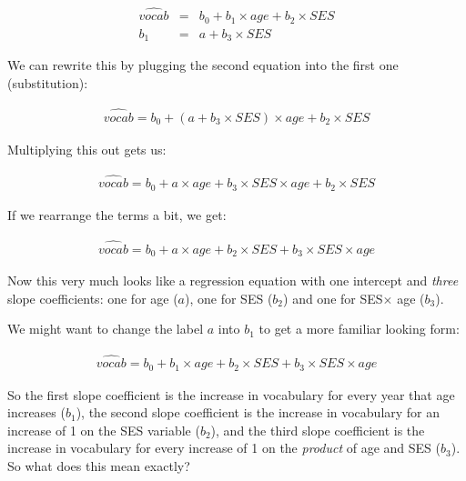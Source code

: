 \documentclass[]{book}\usepackage[]{graphicx}\usepackage[]{color}
\begin{document}
\begin{eqnarray}
\widehat{vocab} &=& b_0 + b_1 \times age + b_2 \times SES  \\
b_1 &=& a + b_3 \times SES
\end{eqnarray}

We can rewrite this by plugging the second equation into the first one (substitution):

\begin{eqnarray}
\widehat{vocab} = b_0 + (a + b_3 \times SES)  \times age + b_2 \times SES 
\end{eqnarray}


Multiplying this out gets us:

\begin{eqnarray}
\widehat{vocab} = b_0 + a \times age + b_3 \times SES  \times age + b_2 \times SES
\end{eqnarray}

If we rearrange the terms a bit, we get:

\begin{eqnarray}
\widehat{vocab} = b_0 + a \times age + b_2 \times SES + b_3 \times SES  \times age
\end{eqnarray}

Now this very much looks like a regression equation with one intercept and \textit{three} slope coefficients: one for age ($a$), one for SES ($b_2$) and one for SES$\times$ age ($b_3$).


We might want to change the label $a$ into $b_1$ to get a more familiar looking form:

\begin{eqnarray}
\widehat{vocab} = b_0 + b_1\times age + b_2 \times SES + b_3 \times SES  \times age
\end{eqnarray}

So the first slope coefficient is the increase in vocabulary for every year that age increases ($b_1$), the second slope coefficient is the increase in vocabulary for an increase of 1 on the SES variable ($b_2$), and the third slope coefficient is the increase in vocabulary for every increase of 1 on the \textit{product} of age and SES ($b_3$).
\\
So what does this mean exactly?

% 
% 
\end{document}
